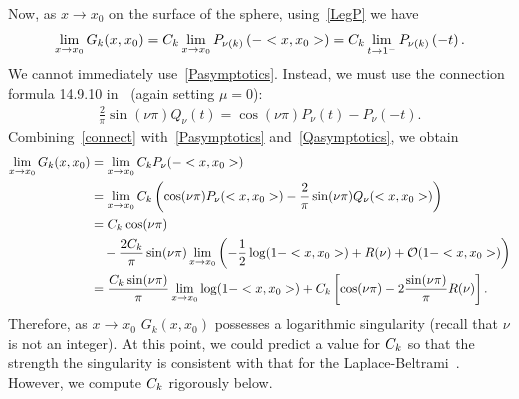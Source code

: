 Now, as $x\rightarrow x_{0}$ on the surface of the sphere,
using~\eqref{LegP} we have 
\begin{align*}
  \lim_{x\rightarrow x_{0}}G_k(x,x_{0}) =
  C_k\lim_{x\rightarrow x_{0}} P_{\nu(k)}\left(-<x,x_{0}>\right) =
  C_k\lim_{t\rightarrow 1^-}P_{\nu(k)}\left(-t\right).
\end{align*}
We cannot immediately use~\eqref{Pasymptotics}. Instead, we must use the
connection formula 14.9.10 in~\cite{fatAbramowitz} (again setting
$\mu=0$):
\begin{align}
  \frac{2}{\pi}\sin(\nu \pi)Q_\nu(t)= \cos(\nu\pi)P_\nu(t) - P_\nu(-t).
  \label{connect}
\end{align}
Combining~\eqref{connect} with~\eqref{Pasymptotics}
and~\eqref{Qasymptotics}, we obtain
\begin{align}
  \lim_{x\rightarrow x_{0}}G_k(x,x_{0}) &= \lim_{x\rightarrow x_{0}}
      C_k P_{\nu}(-<x,x_{0}>) \nonumber \\
  &= \lim_{x\rightarrow x_{0} }C_k\left(\cos(\nu\pi)
  P_{\nu}(<x,x_{0}>) - 
      \frac{2}{\pi}\sin(\nu \pi)Q_{\nu}(<x,x_0>)\right) \nonumber \\
  &= C_k\cos(\nu\pi) \nonumber \\
  & \quad - \frac{2C_k}{\pi}\sin(\nu\pi)\lim_{x\rightarrow x_0} 
      \left(-\frac{1}{2}\log(1-<x,x_0>) + R(\nu) +
      \mathcal{O}(1-<x,x_0>)\right) \nonumber \\
  &=\frac{C_k\sin(\nu\pi)}{\pi}\lim_{x\rightarrow x_0}
      \log(1-<x,x_0>) + C_k\left[\cos(\nu\pi)-
      2\frac{\sin(\nu\pi)}{\pi}R(\nu)\right].
  \label{e:logSingularity}
\end{align}
Therefore, as $x\rightarrow x_{0}$ $G_k(x,x_{0})$ possesses a
logarithmic singularity (recall that $\nu$ is not an integer).  At this
point, we could predict a value for $C_k$ so that the strength the
singularity is consistent with that for the
Laplace-Beltrami~\cite{gemmrich}.  However, we compute $C_k$ rigorously
below.

